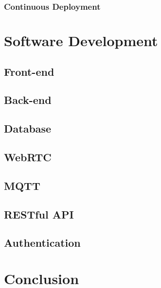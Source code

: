 \documentclass{article}
\begin{document}
        \subsubsection{Continuous Deployment}

\pagebreak

\section{Software Development} 

    \subsection{Front-end}

    \subsection{Back-end}

    \subsection{Database}

    \subsection{WebRTC}

    \subsection{MQTT}

    \subsection{RESTful API}

    \subsection{Authentication}

\pagebreak

\section{Conclusion} 
\end{document}
